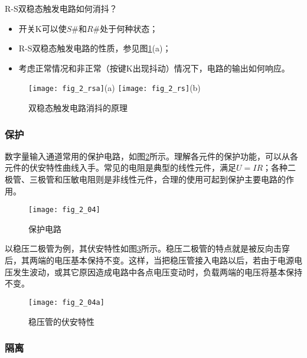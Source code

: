 \begin{remark}
  R-S双稳态触发电路如何消抖？
\begin{itemize}
  \item 开关K可以使$S\#$和$R\#$处于何种状态；
  \item R-S双稳态触发电路的性质，参见图\ref{fig_2_rs}(a)；
  \item 考虑正常情况和非正常（按键K出现抖动）情况下，电路的输出如何响应。
\end{itemize}
\end{remark}

\begin{figure}[h]
  \centering
  \texttt{[image: fig\_2\_rsa]}(a)
  \texttt{[image: fig\_2\_rs]}(b)\\
  \caption{双稳态触发电路消抖的原理}\label{fig_2_rs}
\end{figure}

\subsubsection{保护}

数字量输入通道常用的保护电路，如图\ref{fig_2_04}所示。理解各元件的保护功能，可以从各元件的伏安特性曲线入手。常见的电阻是典型的线性元件，满足$U=IR$；各种二极管、三极管和压敏电阻则是非线性元件，合理的使用可起到保护主要电路的作用。


\begin{figure}[h]
  \centering
  \texttt{[image: fig\_2\_04]}
  \caption{保护电路}\label{fig_2_04}
\end{figure}



以稳压二极管为例，其伏安特性如图\ref{fig_2_04a}所示。稳压二极管的特点就是被反向击穿后，其两端的电压基本保持不变。这样，当把稳压管接入电路以后，若由于电源电压发生波动，或其它原因造成电路中各点电压变动时，负载两端的电压将基本保持不变。

\begin{figure}[h]
  \centering
  \texttt{[image: fig\_2\_04a]}
  \caption{稳压管的伏安特性}\label{fig_2_04a}
\end{figure}


\subsubsection{隔离}

